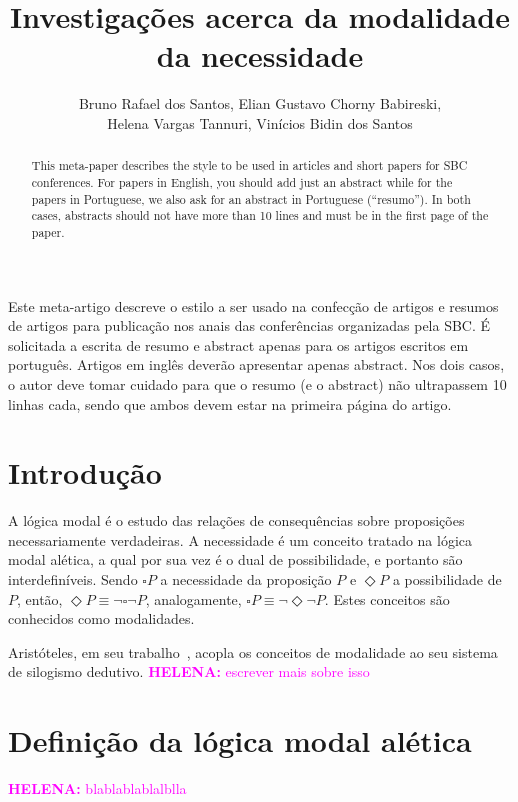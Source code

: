 \documentclass[12pt]{article}
\title{Investigações acerca da modalidade da necessidade}
\author{Bruno Rafael dos Santos\inst{1}, Elian Gustavo Chorny Babireski\inst{1},\\Helena Vargas Tannuri\inst{1}, Vinícios Bidin dos Santos\inst{1}}
\newcommand{\helena}[1]{\textcolor{magenta}{\textbf{HELENA:} #1}}
\begin{document}
 

\maketitle

\begin{abstract}
  This meta-paper describes the style to be used in articles and short papers
  for SBC conferences. For papers in English, you should add just an abstract
  while for the papers in Portuguese, we also ask for an abstract in
  Portuguese (``resumo''). In both cases, abstracts should not have more than
  10 lines and must be in the first page of the paper.
\end{abstract}
     
\begin{resumo} 
  Este meta-artigo descreve o estilo a ser usado na confecção de artigos e
  resumos de artigos para publicação nos anais das conferências organizadas
  pela SBC\@. É solicitada a escrita de resumo e abstract apenas para os artigos
  escritos em português. Artigos em inglês deverão apresentar apenas abstract.
  Nos dois casos, o autor deve tomar cuidado para que o resumo (e o abstract)
  não ultrapassem 10 linhas cada, sendo que ambos devem estar na primeira
  página do artigo.
\end{resumo}


\section{Introdução}
A lógica modal é o estudo das relações de consequências sobre proposições necessariamente verdadeiras.
A necessidade é um conceito tratado na lógica modal alética, a qual por sua vez é o dual de possibilidade, e portanto são interdefiníveis. Sendo $\square P$ a necessidade da proposição $P$ e $\Diamond P$ a possibilidade de $P$, então, $\Diamond P \equiv \neg \square \neg P$, analogamente, $\square P \equiv \neg \Diamond \neg P$. Estes conceitos são conhecidos como modalidades.

Aristóteles, em seu trabalho~\cite{Aristotle-A}, acopla os conceitos de modalidade ao seu sistema de silogismo dedutivo. \helena{escrever mais sobre isso}


\section{Definição da lógica modal alética} \label{sec:definicao}
  \helena{blablablablalblla \cite{silveira2020implementacao}}
\end{document}
